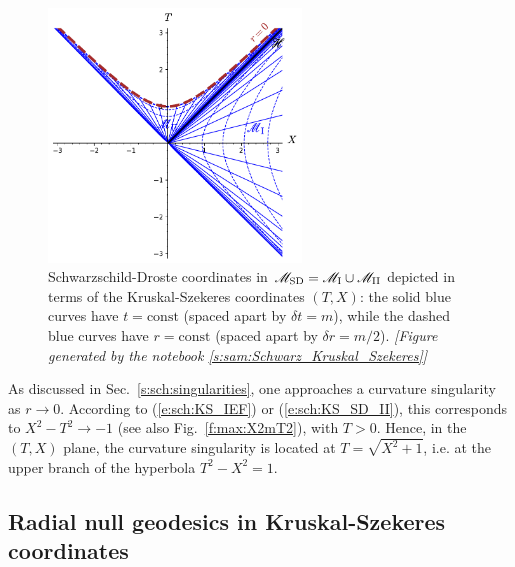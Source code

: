 \begin{figure}
\centerline{\includegraphics[width=0.6\textwidth]{max_SD_KS.pdf}}
\caption[]{\label{f:sch:SD_KS} \footnotesize
Schwarzschild-Droste coordinates in $\mathscr{M}_{\rm SD} = \mathscr{M}_{\rm I}\cup \mathscr{M}_{\rm II}$
depicted in terms of the Kruskal-Szekeres coordinates $(T,X)$: the solid blue
curves have $t=\mathrm{const}$ (spaced apart by $\delta t = m$), while the
dashed blue curves have $r=\mathrm{const}$ (spaced apart by $\delta r = m/2$).
\textsl{[Figure generated by the notebook \ref{s:sam:Schwarz_Kruskal_Szekeres}]}
}
\end{figure}


As discussed in Sec.~\ref{s:sch:singularities}, one approaches a
curvature singularity as $r\rightarrow 0$. According to (\ref{e:sch:KS_IEF})
or (\ref{e:sch:KS_SD_II}),
this corresponds to $X^2-T^2 \rightarrow -1$ (see also Fig.~\ref{f:max:X2mT2}), with
$T > 0$. Hence, in the $(T,X)$ plane, the curvature singularity is located
at $T = \sqrt{X^2 + 1}$, i.e. at the upper branch of the hyperbola
$T^2 - X^2 = 1$.

\subsection{Radial null geodesics in Kruskal-Szekeres coordinates}
\label{s:sch:rad_null_geod_KS}

